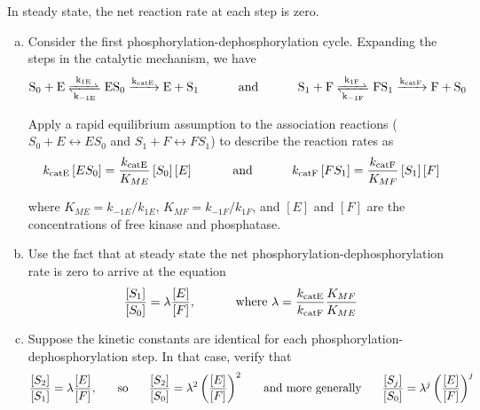 \documentclass{article}
\begin{document}
In steady state, the net reaction rate at each step is zero.

\begin{enumerate}[a)]
\setlength{\itemsep}{0pt}
\item Consider the first phosphorylation-dephosphorylation cycle. Expanding the steps in the catalytic mechanism, we have
\[ \ce{S_0 + E <=>[k_{1E}][k_{-1E}] ES_0 ->[k_{catE}] E + S_1} \hspace{1 cm} \textrm{ and } \hspace{1 cm} \ce{S_1 + F <=>[k_{1F}][k_{-1F}] FS_1 ->[k_{catF}] F + S_0} \]

Apply a rapid equilibrium assumption to the association reactions ($S_0 + E \leftrightarrow ES_0$ and \linebreak $S_1 + F \leftrightarrow FS_1$) to describe the reaction rates as
\[ k_{\textrm{catE}} \left[ ES_0 \right] = \frac{k_{\textrm{catE}}}{K_{ME}} \left[ S_0 \right] \left[ E \right] \hspace{1 cm} \textrm{ and } \hspace{ 1cm} k_{\textrm{catF}} \left[ FS_1 \right] = \frac{k_{\textrm{catF}}}{K_{MF}} \left[ S_1 \right] \left[ F \right] \]

where $K_{ME} = k_{-1E}/k_{1E}$, $K_{MF} = k_{-1F}/k_{1F}$, and $[E]$ and $[F]$ are the concentrations of free kinase and phosphatase.

\item Use the fact that at steady state the net phosphorylation-dephosphorylation rate is zero to arrive at the equation
\[ \frac{\left[ S_1 \right]}{\left[ S_0 \right]} = \lambda \frac{\left[ E \right]}{\left[ F \right]}, \hspace{ 1 cm} \textrm{ where } \lambda = \frac{k_{\textrm{catE}}}{k_{\textrm{catF}}} \frac{K_{MF}}{K_{ME}}\]

\item Suppose the kinetic constants are identical for each phosphorylation-dephosphorylation step. In that case, verify that
\[ \frac{\left[ S_2 \right]}{\left[ S_1 \right]} = \lambda \frac{\left[ E \right]}{\left[ F \right]}, \hspace{0.5 cm}  \textrm{ so } \hspace{0.5 cm} \frac{\left[ S_2 \right]}{\left[ S_0 \right]} = \lambda^2 \left( \frac{\left[ E \right]}{\left[ F \right] } \right)^2 \hspace{0.5 cm}  \textrm{ and more generally } \hspace{0.5 cm}  \frac{\left[ S_j \right]}{\left[ S_0 \right]} = \lambda^j  \left( \frac{\left[ E \right]}{\left[ F \right] } \right)^j \]


\end{enumerate}
\end{document}
